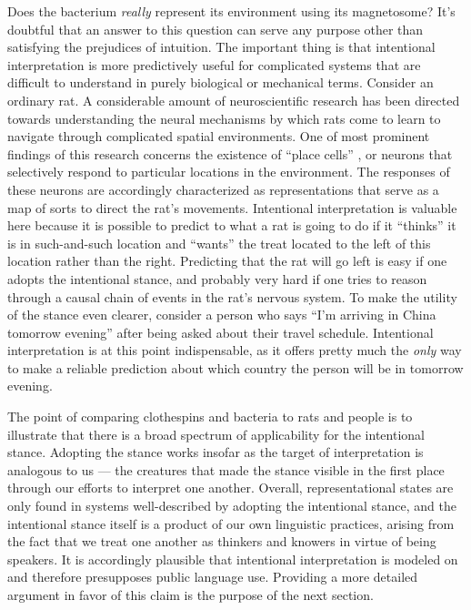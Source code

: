 Does the bacterium \textit{really} represent its environment using its magnetosome? It's doubtful that an answer to this question can serve any purpose other than satisfying the prejudices of intuition. The important thing is that intentional interpretation is more predictively useful for complicated systems that are difficult to understand in purely biological or mechanical terms. Consider an ordinary rat. A considerable amount of neuroscientific research has been directed towards understanding the neural mechanisms by which rats come to learn to navigate through complicated spatial environments. One of most prominent findings of this research concerns the existence of ``place cells'' \citep[][p. 369]{Eliasmith:2013}, or neurons that selectively respond to particular locations in the environment. The responses of these neurons are accordingly characterized as representations that serve as a map of sorts to direct the rat's movements. Intentional interpretation is valuable here because it is possible to predict to what a rat is going to do if it ``thinks'' it is in such-and-such location and ``wants'' the treat located to the left of this location rather than the right. Predicting that the rat will go left is easy if one adopts the intentional stance, and probably very hard if one tries to reason through a causal chain of events in the rat's nervous system. To make the utility of the stance even clearer, consider a person who says ``I'm arriving in China tomorrow evening'' after being asked about their travel schedule. Intentional interpretation is at this point indispensable, as it offers pretty much the \textit{only} way to make a reliable prediction about which country the person will be in tomorrow evening. 

The point of comparing clothespins and bacteria to rats and people is to illustrate that there is a broad spectrum of applicability for the intentional stance. Adopting the stance works insofar as the target of interpretation is analogous to us --- the creatures that made the stance visible in the first place through our efforts to interpret one another. Overall, representational states are only found in systems well-described by adopting the intentional stance, and the intentional stance itself is a product of our own linguistic practices, arising from the fact that we treat one another as thinkers and knowers in virtue of being speakers. It is accordingly plausible that intentional interpretation is modeled on and therefore presupposes public language use. Providing a more detailed argument in favor of this claim is the purpose of the next section. 

